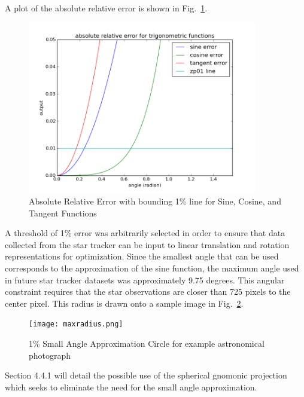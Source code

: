 \documentclass[12pt,a4paper]{book}
\begin{document}
A plot of the absolute relative error is shown in Fig.~\ref{f:absrel}.
\begin{figure}[!ht]%
\centering
 \includegraphics[width=10cm]{trigabsrel.png}
 \caption{Absolute Relative Error with bounding 1\% line for Sine, Cosine, and Tangent Functions}
\label{f:absrel}
\end{figure} 
\FloatBarrier
A threshold of 1\% error was arbitrarily selected in order to ensure that data collected from the star tracker can be input to linear translation and rotation representations for optimization.  Since the smallest angle that can be used corresponds to the approximation of the sine function, the maximum angle used in future star tracker datasets was approximately 9.75 degrees.  This angular constraint requires that the star observations are closer than 725 pixels to the center pixel.  This radius is drawn onto a sample image in Fig.~\ref{f:maxradius}.
\begin{figure}[!ht]%
\centering
 \texttt{[image: maxradius.png]}
 \caption{1\% Small Angle Approximation Circle for example astronomical photograph}
\label{f:maxradius}
\end{figure} 
\FloatBarrier
Section 4.4.1 will detail the possible use of the spherical gnomonic projection which seeks to eliminate the need for the small angle approximation.  
\end{document}
